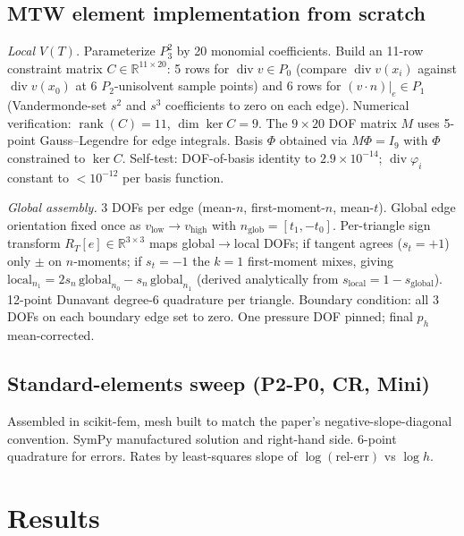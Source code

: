 \documentclass[11pt]{article}
\begin{document}
\subsection{MTW element implementation from scratch}
\emph{Local $V(T)$.}  Parameterize $P_3^2$ by 20 monomial coefficients.
Build an 11-row constraint matrix $C\in\mathbb{R}^{11\times 20}$: 5
rows for $\operatorname{div} v\in P_0$ (compare $\operatorname{div}
v(x_i)$ against $\operatorname{div} v(x_0)$ at 6 $P_2$-unisolvent
sample points) and 6 rows for $(v\cdot n)|_e\in P_1$ (Vandermonde-set
$s^2$ and $s^3$ coefficients to zero on each edge).  Numerical
verification: $\operatorname{rank}(C){=}11$, $\dim\ker C=9$.  The
$9\times 20$ DOF matrix $M$ uses 5-point Gauss--Legendre for edge
integrals.  Basis $\Phi$ obtained via $M\Phi = I_9$ with $\Phi$
constrained to $\ker C$.  Self-test: DOF-of-basis identity to
$2.9\times 10^{-14}$; $\operatorname{div}\varphi_i$ constant to
$<10^{-12}$ per basis function.

\emph{Global assembly.}  3 DOFs per edge (mean-$n$, first-moment-$n$,
mean-$t$).  Global edge orientation fixed once as
$v_{\text{low}}{\to}v_{\text{high}}$ with
$n_{\text{glob}}{=}[t_1,-t_0]$.  Per-triangle sign transform
$R_T[e]\in\mathbb{R}^{3\times 3}$ maps global$\to$local DOFs; if
tangent agrees ($s_t{=}{+}1$) only $\pm$ on $n$-moments; if
$s_t{=}{-}1$ the $k{=}1$ first-moment mixes, giving
$\text{local}_{n_1}=2s_n\,\text{global}_{n_0}-s_n\,\text{global}_{n_1}$
(derived analytically from $s_{\text{local}}=1-s_{\text{global}}$).
12-point Dunavant degree-6 quadrature per triangle.  Boundary
condition: all 3 DOFs on each boundary edge set to zero.  One pressure
DOF pinned; final $p_h$ mean-corrected.

\subsection{Standard-elements sweep (P2-P0, CR, Mini)}
Assembled in scikit-fem, mesh built to match the paper's
negative-slope-diagonal convention.  SymPy manufactured solution and
right-hand side.  6-point quadrature for errors.  Rates by
least-squares slope of $\log(\text{rel-err})$ vs $\log h$.

\section{Results}
\end{document}
